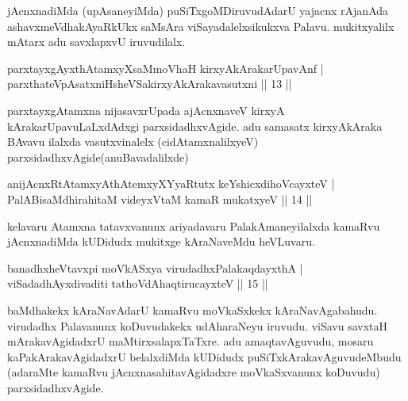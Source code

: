 \begin{artha}
jAcnxnadiMda (upAsaneyiMda) puSiTxgoMDiruvudAdarU yajacnx rAjanAda ashavxmeVdhakAyaRkUkx saMsAra viSayadalelxsikukxva Palavu. mukitxyalilx mAtarx adu savxlapxvU iruvudilalx.
\end{artha}


\begin{shl}
parxtayxgAyxthAtamxyXsaMmoVhaH kirxyAkArakarUpavAnf |\\
parxthateV\s pAsatxniHsheVSakirxyAkArakavasutxni \hfill || 13 ||
\end{shl}

\begin{artha}
parxtayxgAtamxna nijasavxrUpada ajAcnxnaveV kirxyA kArakarUpavuLaLxdAdxgi parxsidadhxvAgide. adu samasatx kirxyAkAraka BAvavu ilalxda vasutxvinalelx (cidAtamxnalilxyeV) parxsidadhxvAgide(anuBavadalilxde)
\end{artha}


\begin{shl}
anijAcnxRtAtamxyAthAtemxyXYyaRtutx keYshicxdihoVcayxteV |\\
PalABisaMdhirahitaM videyxVtaM kamaR mukatxyeV \hfill || 14 ||
\end{shl}

\begin{artha}
kelavaru Atamxna tatavxvanunx ariyadavaru PalakAmaneyilalxda kamaRvu jAcnxnadiMda kUDidudx mukitxge kAraNaveMdu heVLuvaru.
\end{artha}


\begin{shl}
banadhxheVtavxpi moVkASxya virudadhxPalakaqdayxthA |\\
viSadadhAyxdivaditi tathoVdAhaqtirucayxteV \hfill || 15 ||
\end{shl}

\begin{artha}
baMdhakekx kAraNavAdarU kamaRvu moVkaSxkekx kAraNavAgabahudu. virudadhx Palavanunx koDuvudakekx udAharaNeyu iruvudu. viSavu savxtaH mArakavAgidadxrU maMtirxsalapxTaTxre. adu amaqtavAguvudu, mosaru kaPakArakavAgidadxrU belalxdiMda kUDidudx puSiTxkArakavAguvudeMbudu (adaraMte kamaRvu jAcnxnasahitavAgidadxre moVkaSxvanunx koDuvudu) parxsidadhxvAgide.
\end{artha}

